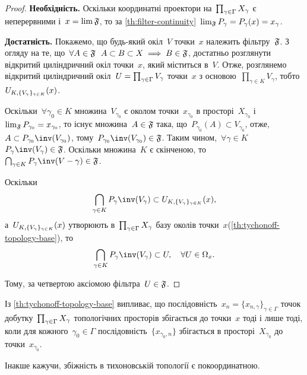 \begin{proof}
    \textbf{Необхідність.} Оскільки координатні проектори на~$\prod_{\gamma\in\Gamma}{X}_\gamma$ є неперервними і~$x = \lim \frak F$, то за \cref{th:filter-continuity}~$\lim_{\frak F} P_\gamma = P_\gamma(x) = x_\gamma$.

    \textbf{Достатність.} Покажемо, що будь-який окіл~$V$ точки~$x$ належить фільтру~$\frak F$. З огляду на те, що~$\forall A \in \frak F$~$A \subset B \subset X \implies B \in \frak F$, достатньо розглянути відкритий циліндричний окіл точки~$x$, який міститься в~$V$. Отже, розглянемо відкритий циліндричний окіл~$U = \prod_{\gamma\in\Gamma}{V}_\gamma$ точки~$x$ з основою~$\prod_{\gamma \in K} V_\gamma$, тобто~$U_{K,\{V_\gamma\}_{\gamma\in K}}(x)$.
    
    Оскільки~$\forall \gamma_0 \in K$ множина~$V_{\gamma_0}$ є околом точки~$x_{\gamma_0}$ в просторі~$X_{\gamma_0}$ і~$\lim_{\frak F} P_{\gamma_0} = x_{\gamma_0}$, то існує множина~$A \in \frak F$ така, що~$P_{\gamma_0}(A) \subset V_{\gamma_0}$, отже,~$A \subset P_{\gamma_0}\inv(V_{\gamma_0})$, тому~$P_{\gamma_0}\inv(V_{\gamma_0}) \in \frak F$. Таким чином,~$\forall \gamma \in K$~$P_\gamma\inv(V_\gamma) \in \frak F$. Оскільки множина~$K$ є скінченою, то~$\bigcap_{\gamma \in K} P_\gamma\inv(V-\gamma) \in \frak F$.
    
    Оскільки
    \begin{equation*}
        \bigcap_{\gamma \in K} P_\gamma\inv(V_\gamma) \subset \CartesianNeighbourhood{x},
    \end{equation*}
    а~$U_{K,\{V_\gamma\}_{\gamma\in K}}(x)$ утворюють в~$\prod_{\gamma\in\Gamma}{X}_\gamma$ базу околів точки~$x$(\cref{th:tychonoff-topology-base}), то
    \begin{equation*}
        \bigcap_{\gamma \in K} P_\gamma\inv(V_\gamma) \subset U, \quad \forall U \in \Omega_x.
    \end{equation*}

    Тому, за четвертою аксіомою фільтра~$U \in \frak F$.
\end{proof}

\begin{remark}
    Із \cref{th:tychonoff-topology-base} випливає, що послідовність~$x_n = \{x_{n,\gamma}\}_{\gamma \in \Gamma}$ точок добутку~$\prod_{\gamma\in\Gamma}{X}_\gamma$ топологічних просторів збігається до точки~$x$ тоді і лише тоді, коли для кожного~$\gamma_0 \in \Gamma$ послідовність~$\{x_{\gamma_0, n}\}$ збігається в просторі~$X_{\gamma_0}$ до точки~$x_{\gamma_0}$. 
    
    Інакше кажучи, збіжність в тихоновській топології є покоординатною.
\end{remark}

